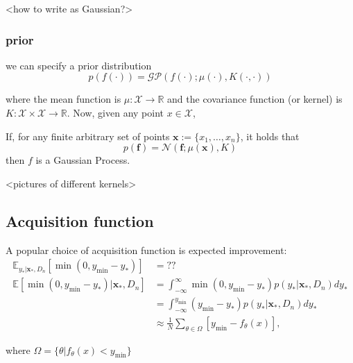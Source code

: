 <how to write as Gaussian?>

\subsubsection{prior}
we can specify a prior distribution 
$$p(f(\cdot)) = \mathcal{GP}(f(\cdot);\mu(\cdot),K(\cdot,\cdot))$$

where the mean function is $\mu: \mathcal{X} \rightarrow \mathbb{R}$ and the covariance
function (or kernel) is $K: \mathcal{X}\times \mathcal{X} \rightarrow \mathbb{R}$. 
Now, given any point $x \in \mathcal{X}$, 

If, for any finite arbitrary set of points $\textbf{x} := \{x_1, \dots,x_n\}$, it holds that
$$p(\textbf{f}) = \mathcal{N}(\textbf{f}; \mu(\textbf{x}), K)$$
then $f$ is a Gaussian Process. 

<pictures of different kernels>


\subsection{Acquisition function}
A popular choice of acquisition function is expected improvement:
\begin{align*}
    \mathbb{E}_{y_*|\textbf{x}_*,D_n}[\min(0,y_{\min}-y_*)] &= ??\\
    \mathbb{E}[\min(0,y_{\min}-y_*)|\textbf{x}_*,D_n] &= \int_{-\infty}^\infty \min(0,y_{\min}-y_*) p(y_*|\textbf{x}_*,D_n) dy_*\\
    &= \int_{-\infty}^{y_{\min}} (y_{\min}-y_*) p(y_*|\textbf{x}_*,D_n) dy_*\\
    &\approx \frac{1}{N} \sum_{\theta \in \Omega } [y_{\min}-f_\theta(x)],
\end{align*}

where $\Omega = \{\theta|f_{\theta}(x)< y_{\min}\}$

